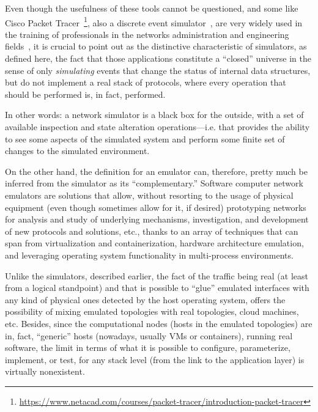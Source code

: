 Even though the usefulness of these tools cannot be questioned, and some like Cisco Packet Tracer~\footnote{\url{https://www.netacad.com/courses/packet-tracer/introduction-packet-tracer}}, also a discrete event simulator~\cite{evaluatingnetsimmethodologicapproach}, are very widely used in the training of professionals in the networks administration and engineering fields~\cite{rolepackettracer}, it is crucial to point out as the distinctive characteristic of simulators, as defined here, the fact that those applications constitute a ``closed'' universe in the sense of only \emph{simulating} events that change the status of internal data structures, but do not implement a real stack of protocols, where every operation that should be performed is, in fact, performed. %

In other words: a network simulator is a black box for the outside, with a set of available inspection and state alteration operations---i.e. that provides the ability to see some aspects of the simulated system and perform some finite set of changes to the simulated environment.

On the other hand, the definition for an emulator can, therefore, pretty much be inferred from the simulator as its ``complementary.''
Software computer network emulators are solutions that allow, without resorting to the usage of physical equipment (even though sometimes allow for it, if desired) prototyping networks for analysis and study of underlying mechanisms, investigation, and development of new protocols and solutions, etc., thanks to an array of techniques that can span from virtualization and containerization, hardware architecture emulation, and leveraging operating system functionality in multi-process environments.

Unlike the simulators, described earlier, the fact of the traffic being real (at least from a logical standpoint) and that is possible to ``glue'' emulated interfaces with any kind of physical ones detected by the host operating system, offers the possibility of mixing emulated topologies with real topologies, cloud machines, etc.
Besides, since the computational nodes (hosts in the emulated topologies) are in, fact, ``generic'' hosts (nowadays, usually VMs or containers), running real software, the limit in terms of what it is possible to configure, parameterize, implement, or test, for any stack level (from the link to the application layer) is virtually nonexistent.

